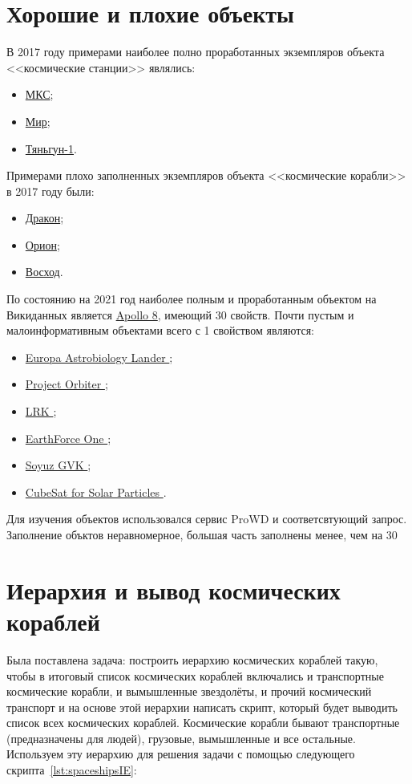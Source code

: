 \section{Хорошие и плохие объекты}
В 2017 году примерами наиболее полно проработанных экземпляров объекта <<космические станции>> являлись:
\begin{itemize}
  \item\href{https://www.wikidata.org/wiki/Q25271}{МКС};
  \item\href{https://www.wikidata.org/wiki/Q48604}{Мир};
  \item\href{https://www.wikidata.org/wiki/Q131500}{Тяньгун-1}.
\end{itemize}
Примерами плохо заполненных экземпляров объекта <<космические корабли>> в 2017 году были:
\begin{itemize}
  \item\href{https://www.wikidata.org/wiki/Q236448}{Дракон};
  \item\href{https://www.wikidata.org/wiki/Q211727}{Орион};
  \item\href{https://www.wikidata.org/wiki/Q841176}{Восход}.
\end{itemize}
По состоянию на 2021 год наиболее полным и проработанным объектом на Викиданных является \href{ https://www.wikidata.org/wiki/Q184201}{Apollo 8}, имеющий 30 свойств.
Почти пустым и малоинформативным объектами всего с 1 свойством являются: 
\begin{itemize}
  \item\href{https://www.wikidata.org/wiki/Q10491365}{ Europa Astrobiology Lander };
  \item\href{https://www.wikidata.org/wiki/Q6514453 }{ Project Orbiter };
  \item\href{https://www.wikidata.org/wiki/Q5961734 }{ LRK };
  \item\href{https://www.wikidata.org/wiki/Q5327028 }{ EarthForce One };
  \item\href{https://www.wikidata.org/wiki/Q60767924 }{ Soyuz GVK };
  \item\href{https://www.wikidata.org/wiki/Q22907583 }{ CubeSat for Solar Particles }.
\end{itemize}
Для изучения объектов использовался сервис ProWD и соответсвтующий {{запрос}\protect\footnotemark}. Заполнение объктов неравномерное, большая часть заполнены менее, чем на 30%
\section{Иерархия и вывод космических кораблей}
Была поставлена задача: построить иерархию космических кораблей такую, чтобы в итоговый список космических кораблей включались и транспортные космические корабли, и вымышленные звездолёты, и прочий космический транспорт и на основе этой иерархии написать скрипт, который будет выводить список всех космических кораблей. Космические корабли бывают транспортные (предназначены для людей), грузовые, вымышленные и все остальные. Используем эту иерархию для решения задачи с помощью следующего скрипта~\ref{lst:spaceshipsIE}:

